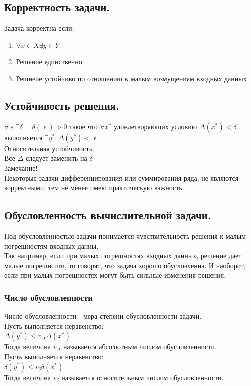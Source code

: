 \documentclass[16pt]{article}
\begin{document}
			\subsection{Корректность задачи.}
			Задача корректна если:
			\begin{enumerate}
				\item{$\forall x\in X \exists y\in Y$}
				\item{Решение единственно}
				\item{Решнеие устойчиво по отношению к малым возмущениям входных данных}
			\end{enumerate}
			\subsection{Устойчивость решения.} 
			$\forall \upvarepsilon \exists \delta=\delta(\upvarepsilon)>0$ такое что $\forall x^{*}$ удовлетворяющих условию $\Delta(x^{*})<\delta$ выполняется $\exists y^{*}: \Delta(y^{*})<\upvarepsilon$\\
			Относительная устойчивость.\\
			Все $\Delta$ следует заменить на $\delta$\\
			Замечание!\\
			Некоторые задачи дифференцирования или суммирования ряда, не являются корректными, тем не менее имею практическую важность.\\
			\subsection{Обусловленность вычислительной задачи.}
			Под обусловленностью задачи понимается чувствительность решения к малым погрешностям входных данны.\\
			Так например, если при малых погрешностях входных данных, решение дает малые погрешнсоти, то говорят, что задача хорошо обусловленна. И наоборот, если при малых погрешностях могут быть сильные изменения решения.\\
			\subsubsection{Число обусловленности}
			Число обусловленности - мера степени обусловленности задачи.\\
			Пусть выполняется неравенство:\\
			$\Delta (y^{*}) \leq v_\Delta \Delta(x^{*})$\\
			Тогда величина $v_\Delta$ называется абсолютным числом обусловленности.\\
			Пусть выполняется неравенство:\\
			$\delta (y^{*}) \leq v_\delta \delta(x^{*})$\\
			Тогда величина $v_\delta$ называется относительным числом обусловленности.\\
\end{document}

